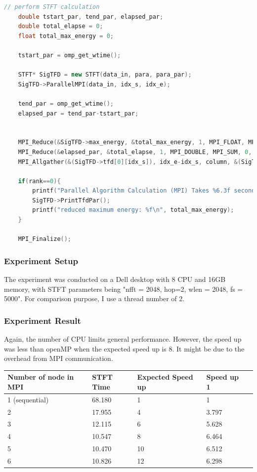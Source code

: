 \documentclass[11pt,letter]{article}
\begin{document}
\begin{lstlisting}[language=C++]
	// perform STFT calculation
	double tstart_par, tend_par, elapsed_par;
	double total_elapse = 0;
	float total_max_energy = 0;

	tstart_par = omp_get_wtime();

	STFT* SigTFD = new STFT(data_in, para, para_par);
	SigTFD->ParallelMPI(data_in, idx_s, idx_e);
	
	tend_par = omp_get_wtime(); 
	elapsed_par = tend_par-tstart_par;
	

	MPI_Reduce(&SigTFD->max_energy, &total_max_energy, 1, MPI_FLOAT, MPI_MAX, 0, MPI_COMM_WORLD);
	MPI_Reduce(&elapsed_par, &total_elapse, 1, MPI_DOUBLE, MPI_SUM, 0, MPI_COMM_WORLD);
    MPI_Allgather(&(SigTFD->tfd[0][idx_s]), idx_e-idx_s, column, &(SigTFD->tfd[0][idx_s]), idx_e-idx_s,column, MPI_COMM_WORLD);

	if(rank==0){
		printf("Parallel Algorithm Calculation (MPI) Takes %6.3f seconds on average\n", total_elapse/size);
		SigTFD->PrintTfdPar();
		printf("reduced maximum energy: %f\n", total_max_energy);
	}

	MPI_Finalize();
\end{lstlisting}


\subsubsection{Experiment Setup}
The experiment was conducted on a Dell desktop with 8 CPU and 16GB memory, with STFT parameters being "nfft = 2048, hop=2, wlen = 2048, fs = 5000". For comparison purpose, I use a thread number of 2.

\subsubsection{Experiment Result}
Again, the number of CPU limits general performance. However, the speed up was less than openMP when the expected speed up is 8. It might be due to the overhead from MPI communication.

\begin{center}
  \begin{tabular}{ | l | l | l | l | l |}
    \hline
    Number of node in MPI & STFT Time & Expected Speed up & Speed up 1 \\ \hline
    1 (sequential) & 68.180 &1 & 1  \\ \hline
    2 & 17.955 & 4 &3.797\\ \hline
    3 & 12.115 & 6 & 5.628\\ \hline
    4 & 10.547 & 8 & 6.464\\ \hline
    5 & 10.470 & 10 & 6.512\\ \hline
    6 & 10.826 &  12 & 6.298\\ \hline
  \end{tabular}
\end{center}
\end{document}
